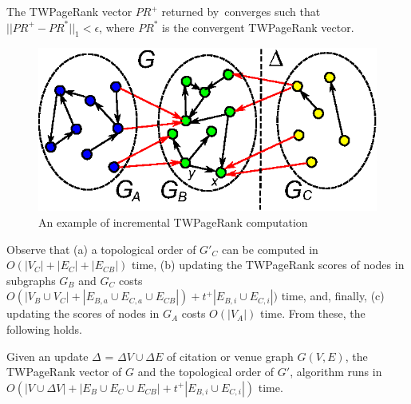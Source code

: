 \vspace{-1ex}
\begin{theorem}
\label{lemma-subgraphA}
The TWPageRank vector $PR^+$ returned by~\inctwprscc converges such that $||PR^+-PR^{*}||_1 < \epsilon$, where $PR^{*}$ is the convergent TWPageRank vector.
\end{theorem}


\begin{figure}[tb!]
\centering
\includegraphics[scale=0.7]{fig/General_framework_peak.eps}
\vspace{-1ex}
\caption{\small An example of incremental TWPageRank computation}
\label{fig-inc-division}
\vspace{-3ex}
\end{figure}

Observe that (a) a topological order of $G'_C$ can be computed in $O(|V_C|+|E_C|+|E_{CB}|)$ time,
(b) updating the TWPageRank scores of nodes in subgraphs $G_B$ and $G_C$ costs $O(|V_B\cup V_C|+|E_{B,a}\cup E_{C,a}\cup E_{CB}|)+t^+|E_{B,i}\cup E_{C,i}|)$ time, and, finally, (c) updating the scores of nodes in $G_A$ costs $O(|V_A|)$ time. From these, the following holds.


\begin{prop} \label{lemma-inc-citation-comp}
Given an update $\Delta$ = $\Delta V\cup\Delta E$ of citation or venue graph $G(V,E)$, the TWPageRank vector of $G$ and the topological order of $G'$, algorithm \inctwprscc runs in $O(|V\cup \Delta V| + |E_B\cup E_C\cup E_{CB}| + t^+|E_{B,i}\cup E_{C,i}|)$ time.
\end{prop}



